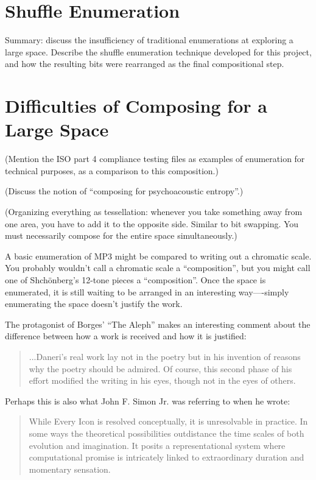 \documentclass{thesis}
\begin{document}
\section{Shuffle Enumeration}

	Summary: discuss the insufficiency of traditional enumerations at exploring a large space. Describe the shuffle enumeration technique developed for this project, and how the resulting bits were rearranged as the final compositional step.
	
\section{Difficulties of Composing for a Large Space}

	(Mention the ISO part 4 compliance testing files as examples of enumeration for technical purposes, as a comparison to this composition.)
	
	(Discuss the notion of ``composing for psychoacoustic entropy''.)
	
	(Organizing everything as tessellation: whenever you take something away from one area, you have to add it to the opposite side. Similar to bit swapping. You must necessarily compose for the entire space simultaneously.)
	
	A basic enumeration of MP3 might be compared to writing out a chromatic scale. You probably wouldn't call a chromatic scale a ``composition'', but you might call one of Shch\"onberg's 12-tone pieces a ``composition''. Once the space is enumerated, it is still waiting to be arranged in an interesting way----simply enumerating the space doesn't justify the work.

	The protagonist of Borges' ``The Aleph'' makes an interesting comment about the difference between how a work is received and how it is justified:
	
	\begin{quote}
	...Daneri's real work lay not in the poetry but in his invention of reasons why the poetry should be admired. Of course, this second phase of his effort modified the writing in his eyes, though not in the eyes of others.
	\end{quote}
	
	Perhaps this is also what John F. Simon Jr. was referring to when he wrote:
	
	\begin{quote}
	While Every Icon is resolved conceptually, it is unresolvable in practice. In some ways the theoretical possibilities outdistance the time scales of both evolution and imagination. It posits a representational system where computational promise is intricately linked to extraordinary duration and momentary sensation.\cite{john_f._simon_jr._given:32_1997}
	\end{quote}
	
\end{document}
